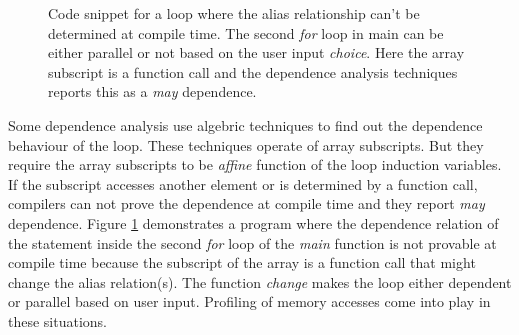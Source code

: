 \documentclass[10pt]{report}          %
\begin{document}
%
%
%
\begin{figure}[h]
\begin{center}
\label{fig:motv_exmp_2}
\caption{Code snippet for a loop where the alias relationship can't be determined at compile time.  The second \textit{for} loop in main can be either parallel or not based on the user input \textit{choice}.  Here the array subscript is a function call and the dependence analysis techniques reports this as a \textit{may} dependence.}
\end{center}
\end{figure}

Some dependence analysis use algebric techniques to find out the dependence behaviour of the loop. \cite{itest} \cite{lrpdtest} \cite{omega}  These techniques operate of array subscripts.  But they require the array subscripts to be \textit{affine} function of the loop induction variables.  If the subscript accesses another element or is determined by a function call, compilers can not prove the dependence at compile time and they report \textit{may} dependence. Figure \ref{fig:motv_exmp_2} demonstrates a program where the dependence relation of the statement inside the second \textit{for} loop of the \textit{main}  function is not provable at compile time because the subscript of the array is a function call that might change the alias relation(s). The function \textit{change} makes the loop either dependent or parallel based on user input.  Profiling of memory accesses come into play in these situations.
\end{document}
